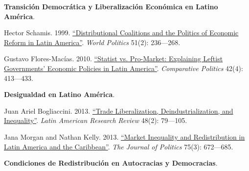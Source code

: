 \documentclass[letterpaper]{article}
\renewenvironment{itemize}{
  \begin{list}{}{
    \setlength{\leftmargin}{1.5em}
  }
}{
  \end{list}
}
\begin{document}
\begin{enumerate}[label=\roman*.]
\begin{itemize}
			\item[19.] {\bf Transici\'on Democr\'atica y Liberalizaci\'on Econ\'omica en Latino Am\'erica}.
				\begin{itemize}
					
          \item[$\circ$] Hector Schamis. 1999. \href{https://github.com/hbahamonde/Ciencia_Politica_II/raw/master/Readings/Schamis_1999.pdf}{``Distributional Coalitions and the Politics of Economic Reform in Latin America''}. \emph{World Politics} 51(2): 236---268.
					
          \item[$\circ$] Gustavo Flores-Mac\'ias. 2010.  \href{https://github.com/hbahamonde/Ciencia_Politica_II/raw/master/Readings/Flores_Macias_2010.pdf}{``Statist vs. Pro-Market: Explaining Leftist Governments' Economic Policies in Latin America''}. \emph{Comparative Politics} 42(4): 413---433.
				\end{itemize}


			\item[20.] {\bf Desigualdad en Latino Am\'erica}.
				\begin{itemize}
					
          \item[$\circ$] Juan Ariel Bogliaccini. 2013. \href{https://github.com/hbahamonde/Ciencia_Politica_II/raw/master/Readings/Bogliaccini.pdf}{``Trade Liberalization, Deindustrialization, and Inequality''}. \emph{Latin American Research Review} 48(2): 79---105.
					
          \item[$\circ$] Jana Morgan and Nathan Kelly. 2013. \href{https://github.com/hbahamonde/Ciencia_Politica_II/raw/master/Readings/Morgan_Kelly.pdf}{``Market Inequality and Redistribution in Latin America and the Caribbean''}. \emph{The Journal of Politics} 75(3): 672---685.
				\end{itemize}


			\item[21.] {\bf Condiciones de Redistribuci\'on en Autocracias y Democracias}.
				\begin{itemize}
					

\end{itemize}
\end{itemize}
\end{enumerate}
\end{document}
